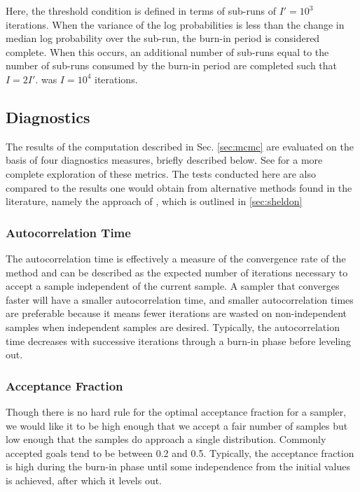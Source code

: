 \documentclass[preprint]{aastex}
\begin{document}
Here, the threshold condition is defined in terms of sub-runs of $I'=10^{3}$ iterations.  When the variance of the log probabilities is less than the change in median log probability over the sub-run, the burn-in period is considered complete.  When this occurs, an additional number of sub-runs equal to the number of sub-runs consumed by the burn-in period are completed such that $I=2I'$.  was $I=10^{4}$ iterations.  

\subsection{Diagnostics}
\label{sec:diag}

The results of the computation described in Sec. \ref{sec:mcmc} are evaluated on the basis of four diagnostics measures, briefly described below.  See \citet{for12} for a more complete exploration of these metrics.  The tests conducted here are also compared to the results one would obtain from alternative methods found in the literature, namely the approach of \citet{she11}, which is outlined in \ref{sec:sheldon}

\subsubsection{Autocorrelation Time}
\label{sec:acorr}

The autocorrelation time is effectively a measure of the convergence rate of the method and can be described as the expected number of iterations necessary to accept a sample independent of the current sample.  A sampler that converges faster will have a smaller autocorrelation time, and smaller autocorrelation times are preferable because it means fewer iterations are wasted on non-independent samples when independent samples are desired.  Typically, the autocorrelation time decreases with successive iterations through a burn-in phase before leveling out.

\subsubsection{Acceptance Fraction}
\label{sec:afrac}

Though there is no hard rule for the optimal acceptance fraction for a sampler, we would like it to be high enough that we accept a fair number of samples but low enough that the samples do approach a single distribution.  Commonly accepted goals tend to be between 0.2 and 0.5.  Typically, the acceptance fraction is high during the burn-in phase until some independence from the initial values is achieved, after which it levels out.
\end{document}
